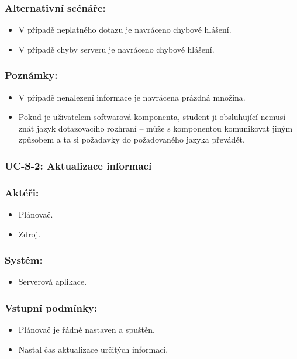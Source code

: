 \subsubsection*{Alternativní scénáře:}
\begin{itemize}
 \item V případě neplatného dotazu je navráceno chybové hlášení.
 \item V případě chyby serveru je navráceno chybové hlášení.
\end{itemize}
\subsubsection*{Poznámky:}
\begin{itemize}
 \item V případě nenalezení informace je navrácena prázdná množina.
 \item Pokud je uživatelem softwarová komponenta, student ji obsluhující nemusí znát jazyk dotazovacího rozhraní -- může s komponentou komunikovat jiným způsobem a ta si požadavky do požadovaného jazyka převádět.
\end{itemize}

\subsubsection{UC-S-2: Aktualizace informací}
\subsubsection*{Aktéři:}
\begin{itemize}
 \item Plánovač.
 \item Zdroj.
\end{itemize}
\subsubsection*{Systém:}
\begin{itemize}
 \item Serverová aplikace.
\end{itemize}
\subsubsection*{Vstupní podmínky:}
\begin{itemize}
 \item Plánovač je řádně nastaven a spuštěn.
 \item Nastal čas aktualizace určitých informací.
\end{itemize}
